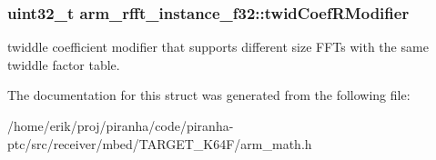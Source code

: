\subsubsection[{\texorpdfstring{twid\+Coef\+R\+Modifier}{twidCoefRModifier}}]{\setlength{\rightskip}{0pt plus 5cm}uint32\+\_\+t arm\+\_\+rfft\+\_\+instance\+\_\+f32\+::twid\+Coef\+R\+Modifier}\hypertarget{structarm__rfft__instance__f32_aede85350fb5ae6baa1b3e8bfa15b18d6}{}\label{structarm__rfft__instance__f32_aede85350fb5ae6baa1b3e8bfa15b18d6}
twiddle coefficient modifier that supports different size F\+F\+Ts with the same twiddle factor table. 

The documentation for this struct was generated from the following file\+:\begin{DoxyCompactItemize}
\item 
/home/erik/proj/piranha/code/piranha-\/ptc/src/receiver/mbed/\+T\+A\+R\+G\+E\+T\+\_\+\+K64\+F/arm\+\_\+math.\+h\end{DoxyCompactItemize}
